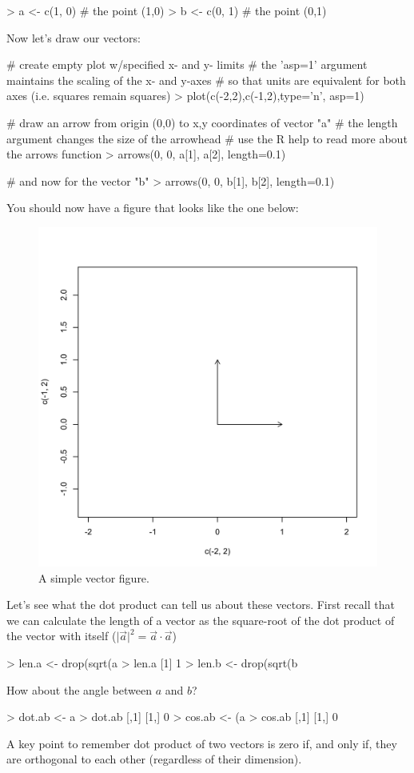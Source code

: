 \begin{R}
> a <- c(1, 0) # the point (1,0)
> b <- c(0, 1) # the point (0,1)
\end{R}
%
Now let's draw our vectors:
%
\begin{R}
# create empty plot w/specified x- and y- limits
# the 'asp=1' argument maintains the scaling of the x- and y-axes
# so that units are equivalent for both axes (i.e. squares remain squares)
> plot(c(-2,2),c(-1,2),type='n', asp=1)

# draw an arrow from origin (0,0) to x,y coordinates of vector "a"
# the length argument changes the size of the arrowhead
# use the R help to read more about the arrows function
> arrows(0, 0, a[1], a[2], length=0.1)

# and now for the vector "b"
> arrows(0, 0, b[1], b[2], length=0.1)
\end{R}
%
You should now have a figure that looks like the one below:
\begin{figure}[htbp]
\centering
\includegraphics[width=0.33\columnwidth]{./figures/hands-on2/rightangle.pdf}
\caption{A simple vector figure.}
\end{figure}
%
Let's see what the dot product can tell us about these vectors. First recall that we can calculate the length of a vector as the square-root of the dot product of the vector with itself ($\vert\vec{a}\vert^2  =  \vec{a} \cdot \vec{a}$)
\begin{R}
> len.a <- drop(sqrt(a %
> len.a
[1] 1
> len.b <- drop(sqrt(b %
\end{R}
%
How about the angle between $a$ and $b$?
\begin{R}
> dot.ab <- a %
> dot.ab
     [,1]
[1,]    0
> cos.ab <- (a %
> cos.ab
     [,1]
[1,]    0
\end{R}
A key point to remember dot product of two vectors is zero if, and only if, they are orthogonal to each other (regardless of their dimension).


